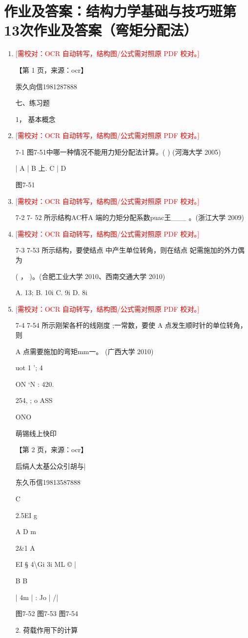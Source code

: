 \documentclass[UTF8,12pt,a4paper,openany]{ctexbook}
\newcommand{\TODO}[1]{\textcolor{red}{[需校对：#1]}}
\begin{document}
\section{作业及答案：结构力学基础与技巧班第13次作业及答案（弯矩分配法）}
\begin{enumerate}[label=\textbf{\arabic*.},leftmargin=2em]
\item \TODO{OCR 自动转写，结构图/公式需对照原 PDF 校对。}\par 【第 1 页，来源：ocr】\par 汞久向信1981287888\par 七、练习题\par 1， 基本概念
\item \TODO{OCR 自动转写，结构图/公式需对照原 PDF 校对。}\par 7-1 图7-51中哪一种情况不能用力矩分配法计算。(  ) (河海大学 2005)\par |     A          |     B          上. C         |     D\par 图7-51
\item \TODO{OCR 自动转写，结构图/公式需对照原 PDF 校对。}\par 7-2 7- 52 所示结构AC杆A 端的力矩分配系数puac王\_\_\_ 。(浙江大学 2009)
\item \TODO{OCR 自动转写，结构图/公式需对照原 PDF 校对。}\par 7-3 7-53 所示结构，要使结点 中产生单位转角，则在结点 妃需施加的外力偶为\par ( ， )。(合肥工业大学 2010、西南交通大学 2010)\par A. 13;                B. 10i                 C. 9i                  D. 8i
\item \TODO{OCR 自动转写，结构图/公式需对照原 PDF 校对。}\par 7-4 7-54 所示刚架各杆的线刚度 ;一常数，要使 A 点发生顺时针的单位转角，则\par A 点需要施加的弯矩mm一。 (广西大学 2010)\par uot 1 '; 4\par ON ‘N : 420.\par 254, ; o ASS\par ONO\par 萌锡线上快印\par \par 【第 2 页，来源：ocr】\par 后绢人太基公众引胡与|\par 东久币信19813587888\par C\par 2.5EI               g\par A                    D                         m\par 2\&1                                                                    A\par EI                   §          4\textbackslash{}Gi             3i ML ©                                    |\par B                                              B\par |      4m      |                 :              Jo |      /|\par 图7-52                  图7-53                    图7-54\par 2. 荷载作用下的计算

\end{enumerate}
\end{document}
